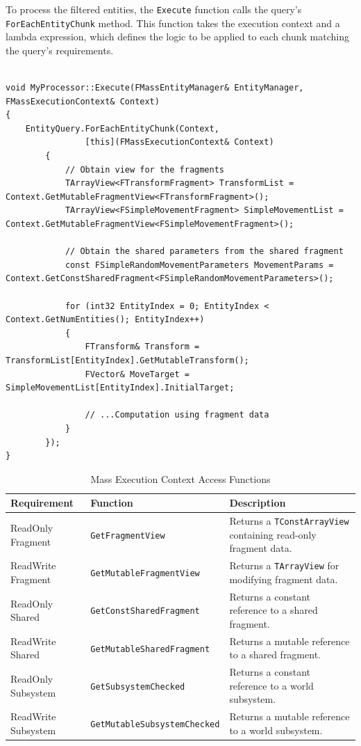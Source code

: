 To process the filtered entities, the \texttt{Execute} function calls the query's \\ \texttt{ForEachEntityChunk} method. This function takes the execution context and a lambda expression, which defines the logic to be applied to each chunk matching the query's requirements.

\begin{lstlisting}
    
void MyProcessor::Execute(FMassEntityManager& EntityManager, FMassExecutionContext& Context)
{
	EntityQuery.ForEachEntityChunk(Context, 
                [this](FMassExecutionContext& Context)
		{
            // Obtain view for the fragments
			TArrayView<FTransformFragment> TransformList = Context.GetMutableFragmentView<FTransformFragment>();
			TArrayView<FSimpleMovementFragment> SimpleMovementList = Context.GetMutableFragmentView<FSimpleMovementFragment>();

            // Obtain the shared parameters from the shared fragment
			const FSimpleRandomMovementParameters MovementParams = Context.GetConstSharedFragment<FSimpleRandomMovementParameters>();

			for (int32 EntityIndex = 0; EntityIndex < Context.GetNumEntities(); EntityIndex++)
			{
				FTransform& Transform = TransformList[EntityIndex].GetMutableTransform();
				FVector& MoveTarget = SimpleMovementList[EntityIndex].InitialTarget;

				// ...Computation using fragment data
			}
		});
}

\end{lstlisting}

\begin{table}[h]
\centering
\caption{Mass Execution Context Access Functions}
\begin{tabular}{|l|l|p{4.7cm}|}
\hline
\textbf{Requirement} & \textbf{Function} & \textbf{Description} \\ \hline
ReadOnly Fragment & \texttt{GetFragmentView} & Returns a \texttt{TConstArrayView} containing read-only fragment data. \\ \hline
ReadWrite Fragment & \texttt{GetMutableFragmentView} & Returns a \texttt{TArrayView} for modifying fragment data. \\ \hline
ReadOnly Shared & \texttt{GetConstSharedFragment} & Returns a constant reference to a shared fragment. \\ \hline
ReadWrite Shared & \texttt{GetMutableSharedFragment} & Returns a mutable reference to a shared fragment. \\ \hline
ReadOnly Subsystem & \texttt{GetSubsystemChecked} & Returns a constant reference to a world subsystem. \\ \hline
ReadWrite Subsystem & \texttt{GetMutableSubsystemChecked} & Returns a mutable reference to a world subsystem. \\ \hline
\end{tabular}
\label{tab:AccessFunctions}
\end{table}


